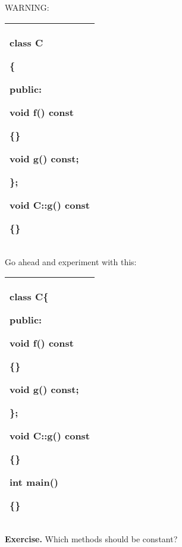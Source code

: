 \documentclass[
]{article}
\begin{document}
WARNING:

\begin{longtable}[]{@{}l@{}}
\toprule
\endhead
\begin{minipage}[t]{0.97\columnwidth}\raggedright
class C

\{

public:

void f() \textbf{const}

\{\}

void g() \textbf{const};

\};

void C::g() \textbf{const}

\{\}\strut
\end{minipage}\tabularnewline
\bottomrule
\end{longtable}

Go ahead and experiment with this:

\begin{longtable}[]{@{}l@{}}
\toprule
\endhead
\begin{minipage}[t]{0.97\columnwidth}\raggedright
class C\{

public:

void f() \textbf{const}

\{\}

void g() \textbf{const};

\};

void C::g() \textbf{const}

\{\}

int main()

\{\}\strut
\end{minipage}\tabularnewline
\bottomrule
\end{longtable}

\textbf{Exercise.} Which methods should be constant?
\end{document}
